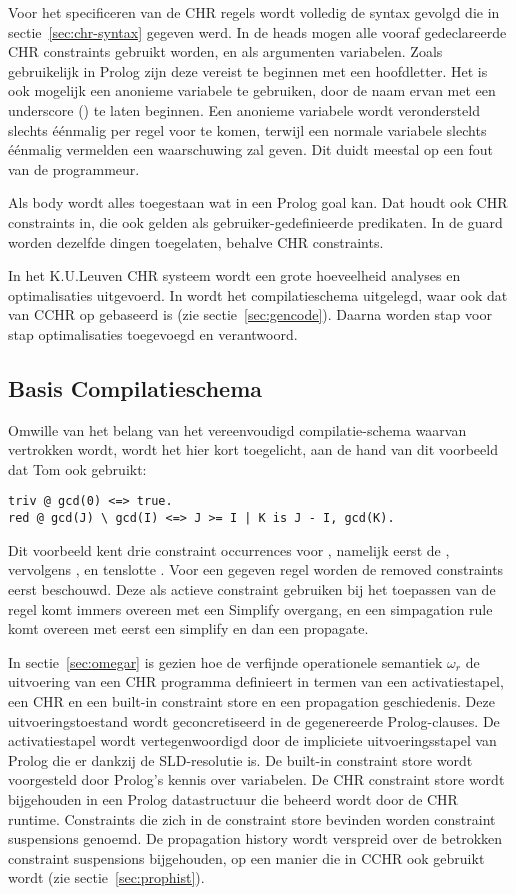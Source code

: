 Voor het specificeren van de CHR regels wordt volledig de syntax gevolgd die in sectie~\ref{sec:chr-syntax} gegeven werd. In de heads mogen alle vooraf gedeclareerde CHR constraints gebruikt worden, en als argumenten variabelen. Zoals gebruikelijk in Prolog zijn deze vereist te beginnen met een hoofdletter. Het is ook mogelijk een anonieme variabele te gebruiken, door de naam ervan met een underscore (\code{\_}) te laten beginnen. Een anonieme variabele wordt verondersteld slechts \'e\'enmalig per regel voor te komen, terwijl een normale variabele slechts \'e\'enmalig vermelden een waarschuwing zal geven. Dit duidt meestal op een fout van de programmeur.

Als body wordt alles toegestaan wat in een Prolog goal kan. Dat houdt ook CHR constraints in, die ook gelden als gebruiker-gedefinieerde predikaten. In de guard worden dezelfde dingen toegelaten, behalve CHR constraints.

In het K.U.Leuven CHR systeem wordt een grote hoeveelheid analyses en optimalisaties uitgevoerd. In \cite{tomsphdthesis} wordt het compilatieschema uitgelegd, waar ook dat van CCHR op gebaseerd is (zie sectie~\ref{sec:gencode}). Daarna worden stap voor stap optimalisaties toegevoegd en verantwoord. 

\subsection{Basis Compilatieschema}

Omwille van het belang van het vereenvoudigd compilatie-schema waarvan vertrokken wordt, wordt het hier kort toegelicht, aan de hand van dit voorbeeld dat Tom ook gebruikt: \begin{Verbatim}[frame=single]
triv @ gcd(0) <=> true.
red @ gcd(J) \ gcd(I) <=> J >= I | K is J - I, gcd(K).
\end{Verbatim}

Dit voorbeeld kent drie constraint occurrences voor , namelijk eerst de , vervolgens , en tenslotte . Voor een gegeven regel worden de removed constraints eerst beschouwd. Deze als actieve constraint gebruiken bij het toepassen van de regel komt immers overeen met een Simplify overgang, en een simpagation rule komt overeen met eerst een simplify en dan een propagate.

In sectie~\ref{sec:omegar} is gezien hoe de verfijnde operationele semantiek $\omega_r$ de uitvoering van een CHR programma definieert in termen van een activatiestapel, een CHR en een built-in constraint store en een propagation geschiedenis. Deze uitvoeringstoestand wordt geconcretiseerd in de gegenereerde Prolog-clauses. De activatiestapel wordt vertegenwoordigd door de impliciete uitvoeringsstapel van Prolog die er dankzij de SLD-resolutie is. De built-in constraint store wordt voorgesteld door Prolog's kennis over variabelen. De CHR constraint store wordt bijgehouden in een Prolog datastructuur die beheerd wordt door de CHR runtime. Constraints die zich in de constraint store bevinden worden constraint suspensions genoemd. De propagation history wordt verspreid over de betrokken constraint suspensions bijgehouden, op een manier die in CCHR ook gebruikt wordt (zie sectie~\ref{sec:prophist}).

